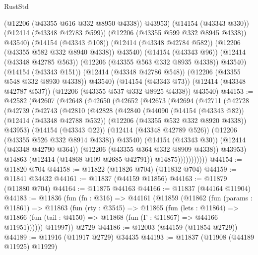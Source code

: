 \begin{lexlean}{RustStd}
\begin{coremodule}
{\begin{coremodule}
{{{{{{{{{{{{{{{{{{{{{{{{{{{{{{{{{{{{{{{{{{{{{{{{{{                (@12206 (@43355 @616 @332 @8950 @4338))
                @43953)
              (@14154 (@43343 @330))
              (@12414 (@43348 @42783 @599))
              (@12206 (@43355 @599 @332 @8945 @4338))
              @43540)
            (@14154 (@43343 @108))
            (@12414 (@43348 @42784 @582))
            (@12206 (@43355 @582 @332 @8940 @4338))
            @43540)
          (@14154 (@43343 @96))
          (@12414 (@43348 @42785 @563))
          (@12206 (@43355 @563 @332 @8935 @4338))
          @43540)
        (@14154 (@43343 @151))
        (@12414 (@43348 @42786 @548))
        (@12206 (@43355 @548 @332 @8930 @4338))
        @43540)
      (@14154 (@43343 @73))
      (@12414 (@43348 @42787 @537))
      (@12206 (@43355 @537 @332 @8925 @4338))
      @43540)
@44153 := @42582
    (@42607
      (@42648
        (@42650
          (@42652
            (@42673
              (@42694
                (@42711
                  (@42728
                    (@42739
                      (@42743
                        (@42810
                          (@42828
                            (@42840
                              (@44090
                                (@14154 (@43343 @82))
                                (@12414 (@43348 @42788 @532))
                                (@12206 (@43355 @532 @332 @8920 @4338))
                                @43953)
                              (@14154 (@43343 @22))
                              (@12414 (@43348 @42789 @526))
                              (@12206 (@43355 @526 @332 @8914 @4338))
                              @43540)
                            (@14154 (@43343 @30))
                            (@12414 (@43348 @42790 @364))
                            (@12206 (@43355 @364 @332 @8909 @4338))
                            @43953)
                          @14863
                          (@12414 (@14868 @109 @2685 @42791))
                          @14875)))))))))))
@44154 := @11820 @704
@44158 := @11822 (@11826 @704) (@11832 @704)
@44159 := @11841 @34432
@44161 := @11837 (@44159 @11856)
@44163 := @11879 (@11880 @704)
@44164 := @11875 @44163
@44166 := @11837 (@44164 @11904)
@44183 := @11836
    (fun (fn : @316) =>
    @44161
      (@11859
        (@11862
          (fun (params : @11861) =>
          @11863
            (fun (rty : @3545) =>
            @11865
              (fun (lets : @11864) =>
              @11866 (fun (tail : @4150) => @11868 (fun (Γ : @11867) => @44166 @11951))))))
        @11997))
    @2729
@44186 := @12003 (@44159 (@11854 @2729))
@44189 := @11916 (@11917 @2729) @34435
@44193 := @11837 (@11908 (@44189 @11925) @11929)
}}}}}}}}}}}}}}}}}}}}}}}}}}}}}}}}}}}}}}}}}}}}}}}}}}
\end{coremodule}}
\end{coremodule}
\end{lexlean}
